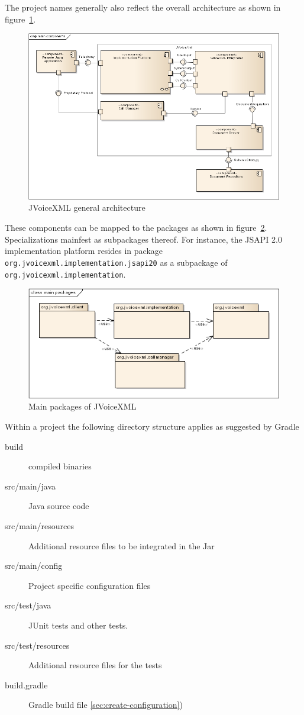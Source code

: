 \documentclass[11pt,a4paper]{article}
\begin{document}
The project names generally also reflect the overall architecture as shown in
figure~\ref{fig:main-components}.
\begin{figure}
\includegraphics[width=\linewidth]{main-components.png}
\caption{JVoiceXML general architecture}
\label{fig:main-components}
\end{figure}
These components can be mapped to the packages as shown in
figure~\ref{fig:main-packages}. Specializations mainfest as subpackages thereof.
For instance, the JSAPI 2.0 implementation platform resides in package 
\lstinline{org.jvoicexml.implementation.jsapi20} as a subpackage of
\lstinline{org.jvoicexml.implementation}.
\begin{figure}
\includegraphics[width=\linewidth]{main-packages.png}
\caption{Main packages of JVoiceXML}
\label{fig:main-packages}
\end{figure}


Within a project the following directory structure applies as suggested by
Gradle

\begin{description}
\item[build] compiled binaries
\item[src/main/java] Java source code
\item[src/main/resources] Additional resource files to be integrated in the Jar
\item[src/main/config] Project specific configuration files
\item[src/test/java] JUnit tests and other tests.
\item[src/test/resources]  Additional resource files for the tests
\item[build.gradle] Gradle build file
\ref{sec:create-configuration})
\end{description}
\end{document}
